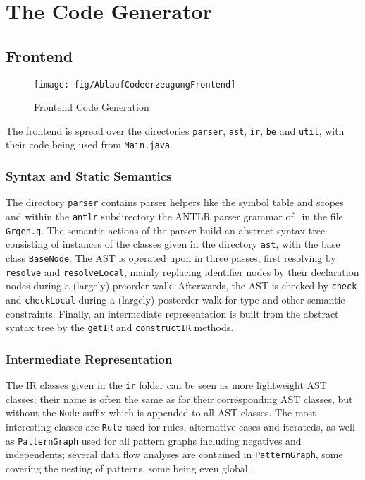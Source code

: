 \section{The Code Generator}

\subsection{Frontend}

\begin{figure}[htbp]
  \centering
  \texttt{[image: fig/AblaufCodeerzeugungFrontend]}
  \caption{Frontend Code Generation}
  \label{figfrontendcodegen}
\end{figure}

The frontend is spread over the directories \texttt{parser}, \texttt{ast}, \texttt{ir}, \texttt{be} and \texttt{util}, with their code being used from \texttt{Main.java}.

\subsubsection*{Syntax and Static Semantics}
The directory \texttt{parser} contains parser helpers like the symbol table and scopes and within the \texttt{antlr} subdirectory the ANTLR parser grammar of \GrG~in the file \texttt{Grgen.g}.
The semantic actions of the parser build an abstract syntax tree consisting of instances of the classes given in the directory \texttt{ast}, with the base class \texttt{BaseNode}.
The AST is operated upon in three passes, first resolving by \texttt{resolve} and \texttt{resolveLocal}, mainly replacing identifier nodes by their declaration nodes during a (largely) preorder walk.
Afterwards, the AST is checked by \texttt{check} and \texttt{checkLocal} during a (largely) postorder walk for type and other semantic constraints.
Finally, an intermediate representation is built from the abstract syntax tree by the \texttt{getIR} and \texttt{constructIR} methods.

\subsubsection*{Intermediate Representation}
The IR classes given in the \texttt{ir} folder can be seen as more lightweight AST classes; their name is often the same as for their corresponding AST classes, but without the \texttt{Node}-suffix which is appended to all AST classes.
The most interesting classes are \texttt{Rule} used for rules, alternative cases and iterateds, as well as \texttt{PatternGraph} used for all pattern graphs including negatives and independents;
several data flow analyses are contained in \texttt{PatternGraph}, some covering the nesting of patterns, some being even global.

